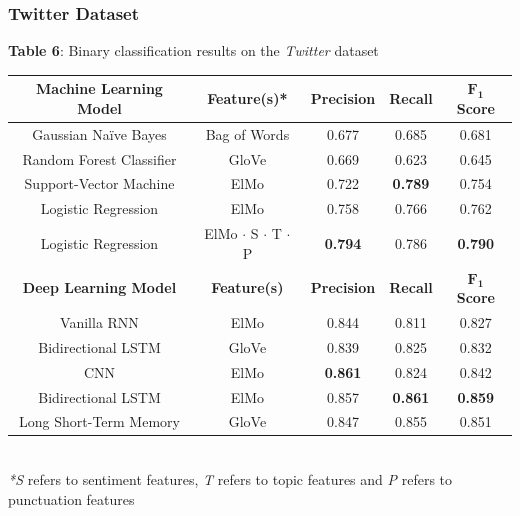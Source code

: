 \documentclass[12pt,a4paper]{article}
\begin{document}
\subsubsection{Twitter Dataset}

\begin{center}
	\textbf{Table 6}: Binary classification results on the \textit{Twitter} dataset\vspace{-5pt}
\end{center}

\begin{center}
	\begin{tabular}{c||c|c|c|c}
		\hline
		\textbf{Machine Learning Model}& \textbf{Feature(s)*} & \textbf{Precision} & \textbf{Recall} & \textbf{$\mathbf{F_1}$ Score}\\
		\hline\hline
		Gaussian Na\"{i}ve Bayes & Bag of Words & 0.677 & 0.685 & 0.681\\
		Random Forest Classifier & GloVe  & 0.669   & 0.623 & 0.645\\
		Support-Vector Machine & ElMo  & 0.722 & \textbf{0.789} & 0.754\\
		Logistic Regression & ElMo  & 0.758 & 0.766 & 0.762\\
		Logistic Regression & ElMo $\cdot$ S $\cdot$ T $\cdot$ P & \textbf{0.794} & 0.786 & \textbf{0.790}\\
		\hline\hline
		\textbf{Deep Learning Model}& \textbf{Feature(s)} & \textbf{Precision} & \textbf{Recall} & \textbf{$\mathbf{F_1}$ Score}\\
		\hline
		Vanilla RNN & ElMo  & 0.844   & 0.811 & 0.827\\
		Bidirectional LSTM & GloVe  & 0.839 & 0.825 & 0.832\\
		CNN & ElMo  & \textbf{0.861}   & 0.824 & 0.842\\
		Bidirectional LSTM & ElMo  & 0.857   & \textbf{0.861} & \textbf{0.859}\\
		Long Short-Term Memory & GloVe & 0.847   & 0.855 & 0.851\\
		\hline
	\end{tabular}
	\\\vspace{5pt}
	\textit{*S} refers to sentiment features, \textit{T} refers to topic features and \textit{P} refers to punctuation features\\\vspace{-5pt}
\end{center}
\end{document}
